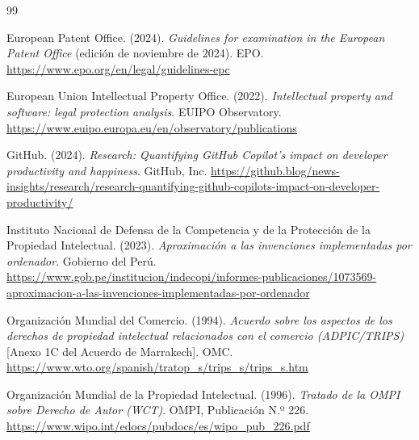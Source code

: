 \documentclass[11pt,a4paper]{report}
\begin{document}
\begin{thebibliography}{99}

European Patent Office. (2024). \textit{Guidelines for examination in the European Patent Office} (edición de noviembre de 2024). EPO. \url{https://www.epo.org/en/legal/guidelines-epc}

European Union Intellectual Property Office. (2022). \textit{Intellectual property and software: legal protection analysis}. EUIPO Observatory. \url{https://www.euipo.europa.eu/en/observatory/publications}

GitHub. (2024). \textit{Research: Quantifying GitHub Copilot's impact on developer productivity and happiness}. GitHub, Inc. \url{https://github.blog/news-insights/research/research-quantifying-github-copilots-impact-on-developer-productivity/}

Instituto Nacional de Defensa de la Competencia y de la Protección de la Propiedad Intelectual. (2023). \textit{Aproximación a las invenciones implementadas por ordenador}. Gobierno del Perú. \url{https://www.gob.pe/institucion/indecopi/informes-publicaciones/1073569-aproximacion-a-las-invenciones-implementadas-por-ordenador}

Organización Mundial del Comercio. (1994). \textit{Acuerdo sobre los aspectos de los derechos de propiedad intelectual relacionados con el comercio (ADPIC/TRIPS)} [Anexo 1C del Acuerdo de Marrakech]. OMC. \url{https://www.wto.org/spanish/tratop_s/trips_s/trips_s.htm}

Organización Mundial de la Propiedad Intelectual. (1996). \textit{Tratado de la OMPI sobre Derecho de Autor (WCT)}. OMPI, Publicación N.º 226. \url{https://www.wipo.int/edocs/pubdocs/es/wipo_pub_226.pdf}


\end{thebibliography}
\end{document}
